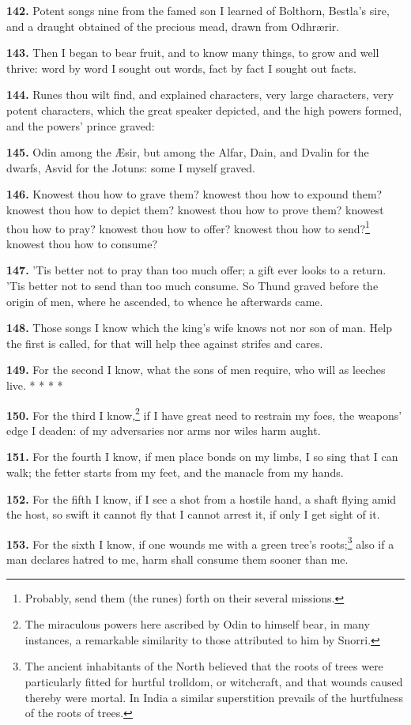 \textbf{142.} Potent songs nine from the famed son I learned of Bolthorn,
Bestla's sire, and a draught obtained of the precious mead, drawn from
Odhrærir.

\textbf{143.} Then I began to bear fruit, and to know many things, to grow
and well thrive: word by word I sought out words, fact by fact I
sought out facts.

\textbf{144.} Runes thou wilt find, and explained characters, very large
characters, very potent characters, which the great speaker depicted,
and the high powers formed, and the powers' prince graved:

\textbf{145.} Odin among the Æsir, but among the Alfar, Dain, and Dvalin for
the dwarfs, Asvid for the Jotuns: some I myself graved.

\textbf{146.} Knowest thou how to grave them? knowest thou how to expound
them? knowest thou how to depict them? knowest thou how to prove them?
knowest thou how to pray? knowest thou how to offer? knowest thou how
to send?\footnote{Probably, send them (the runes) forth on their several
missions.} knowest thou how to consume?

\textbf{147.} 'Tis better not to pray than too much offer; a gift ever looks
to a return. 'Tis better not to send than too much consume. So Thund
graved before the origin of men, where he ascended, to whence he
afterwards came.

\textbf{148.} Those songs I know which the king's wife knows not nor son of
man. Help the first is called, for that will help thee against strifes
and cares.

\textbf{149.} For the second I know, what the sons of men require, who will
as leeches live. * * * *

\textbf{150.} For the third I know,\footnote{The miraculous powers here ascribed by Odin to himself
bear, in many instances, a remarkable similarity to those attributed
to him by Snorri.} if I have great need to restrain my
foes, the weapons' edge I deaden: of my adversaries nor arms nor wiles
harm aught.

\textbf{151.} For the fourth I know, if men place bonds on my limbs, I so
sing that I can walk; the fetter starts from my feet, and the manacle
from my hands.

\textbf{152.} For the fifth I know, if I see a shot from a hostile hand, a
shaft flying amid the host, so swift it cannot fly that I cannot
arrest it, if only I get sight of it.

\textbf{153.} For the sixth I know, if one wounds me with a green tree's
roots;\footnote{The ancient inhabitants of the North believed that the
roots of trees were particularly fitted for hurtful trolldom, or
witchcraft, and that wounds caused thereby were mortal. In India a
similar superstition prevails of the hurtfulness of the roots of
trees.} also if a man declares hatred to me, harm shall consume
them sooner than me.

